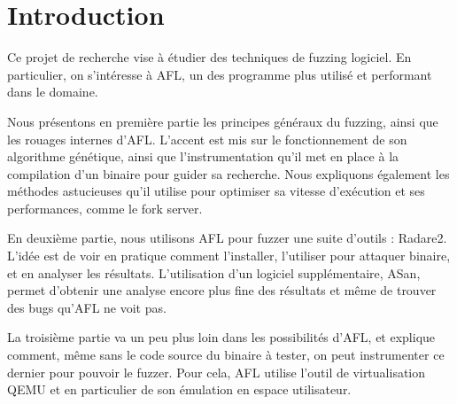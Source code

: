 \chapter*{Introduction}

Ce projet de recherche vise à étudier des techniques de fuzzing logiciel. En
particulier, on s'intéresse à AFL, un des programme plus utilisé et performant
dans le domaine.

Nous présentons en première partie les principes généraux du fuzzing, ainsi que
les rouages internes d'AFL. L'accent est mis sur le fonctionnement de son
algorithme génétique, ainsi que l'instrumentation qu'il met en place à la
compilation d'un binaire pour guider sa recherche. Nous expliquons également les
méthodes astucieuses qu'il utilise pour optimiser sa vitesse d'exécution
et ses performances, comme le fork server.

En deuxième partie, nous utilisons AFL pour fuzzer une suite d'outils :
Radare2. L'idée est de voir en pratique comment l'installer, l'utiliser
pour attaquer binaire, et en analyser les résultats.
L'utilisation d'un logiciel supplémentaire, ASan, permet d'obtenir une
analyse encore plus fine des résultats et même de trouver des bugs qu'AFL ne
voit pas.

La troisième partie va un peu plus loin dans les possibilités d'AFL, et
explique comment, même sans le code source du binaire à tester, on peut
instrumenter ce dernier pour pouvoir le fuzzer. Pour cela, AFL utilise l'outil
de virtualisation QEMU et en particulier de son émulation en espace utilisateur.

